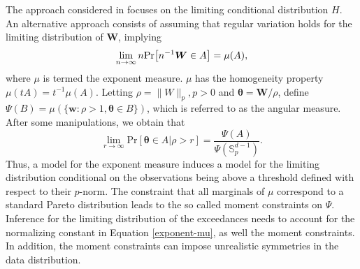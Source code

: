 The approach considered in \cite{rootzen2018} focuses on the limiting
    conditional distribution $H$. An alternative approach consists of assuming
    that regular variation \cite[see, for example,][]{resnick2008extreme} holds 
    for the limiting distribution of $\bm{W}$, implying
    \[
        \lim\limits_{n\rightarrow\infty} n \prob{n^{-1} \bm{W}\in A} = 
        \mu(A),
    \]
    where $\mu$ is termed the exponent measure. $\mu$ has the homogeneity property
    $\mu(tA) = t^{-1}\mu(A)$. Letting $\rho = \|W\|_p, p>0$ 
    and $\bm{\theta} = \bm{W}/\rho$, define  $\Psi(B) = \mu(\{\bm{w} : \rho>1, 
    \bm{\theta} \in B\})$, which is referred to as the angular measure. After 
    some manipulations, we obtain that
    \begin{equation}
    \label{exponent-mu}
        \lim\limits_{r\rightarrow\infty} 
        \text{Pr}\left[\bm{\theta}\in A \rvert \rho>r\right] = 
            \frac{\Psi(A)}{\Psi({\mathbb S}_p^{d-1})} .
    \end{equation}
    Thus, a model for the exponent measure induces a model for the limiting distribution
    conditional on the observations being above a threshold defined with respect
    to their $p$-norm. The constraint that all marginals of $\mu$ correspond to a
    standard Pareto distribution leads to the so called moment constraints on $\Psi$. 
    Inference for the limiting distribution of the exceedances
    needs to account for the normalizing constant in Equation \ref{exponent-mu}, as well
    the moment constraints. In addition, the moment constraints can impose unrealistic
    symmetries in the data distribution.

